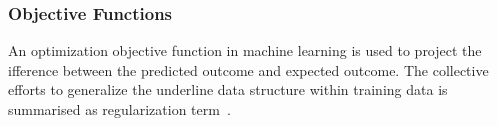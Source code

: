 \subsubsection{Objective Functions}
An optimization objective function in machine learning is used to project the ifference between the predicted outcome and expected outcome. The collective efforts to generalize the underline data structure within training data is summarised as regularization term~\cite{goodfellow_2015}.  